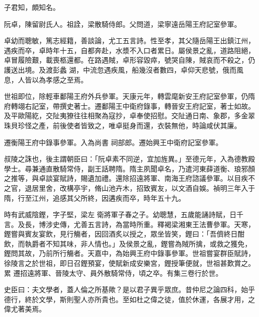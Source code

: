 \begin{pinyinscope}
 子君知，頗知名。



 阮卓，陳留尉氏人。祖詮，梁散騎侍郎。父問道，梁寧遠岳陽王府記室參軍。



 卓幼而聰敏，篤志經籍，善談論，尤工五言詩。性至孝，其父隨岳陽王出鎮江州，遇疾而卒，卓時年十五，自都奔赴，水漿不入口者累日。屬侯景之亂，道路阻絕，卓冒履險艱，載喪柩還都。在路遇賊，卓形容毀瘁，號哭自陳，賊哀而不殺之，仍護送出境。及渡彭蠡
 湖，中流忽遇疾風，船幾沒者數四，卓仰天悲號，俄而風息，人皆以為孝感之至焉。



 世祖即位，除輕車鄱陽王府外兵參軍。天康元年，轉雲麾新安王府記室參軍，仍隋府轉翊右記室，帶撰史著士。遷鄱陽王中衛府錄事，轉晉安王府記室，著士如故。及平歐陽紇，交阯夷獠往往相聚為寇抄，卓奉使招慰。交阯通日南、象郡，多金翠珠貝珍怪之產，前後使者皆致之，唯卓挺身而還，衣裝無他，時論咸伏其廉。



 遷衡陽王府中錄事參軍。入為尚書
 祠部郎。遷始興王中衛府記室參軍。



 叔陵之誅也，後主謂朝臣曰：「阮卓素不同逆，宜加旌異。」至德元年，入為德教殿學士。尋兼通直散騎常侍，副王話聘隋。隋主夙聞卓名，乃遣河東薛道衡、琅邪顏之推等，與卓談宴賦詩，賜遺加禮。還除招遠將軍、南海王府諮議參軍。以目疾不之官，退居里舍，改構亭宇，脩山池卉木，招致賓友，以文酒自娛。禎明三年入于隋，行至江州，追感其父所終，因遘疾而卒，時年五十九。



 時有武威陰鏗，字子堅，梁左
 衛將軍子春之子。幼聰慧，五歲能誦詩賦，日千言。及長，博涉史傳，尤善五言詩，為當時所重。釋褐梁湘東王法曹參軍。天寒，鏗嘗與賓友宴飲，見行觴者，因回酒炙以授之，眾坐皆笑，鏗曰：「吾儕終日酣飲，而執爵者不知其味，非人情也。」及侯景之亂，鏗嘗為賊所擒，或救之獲免，鏗問其故，乃前所行觴者。天嘉中，為始興王府中錄事參軍。世祖嘗宴群臣賦詩，徐陵言之於世祖，即日召鏗預宴，使賦新成安樂宮，鏗授筆便就，世祖甚歎賞之。累
 遷招遠將軍、晉陵太守、員外散騎常侍，頃之卒。有集三卷行於世。



 史臣曰：夫文學者，蓋人倫之所基歟？是以君子異乎眾庶。昔仲尼之論四科，始乎德行，終於文學，斯則聖人亦所貴也。至如杜之偉之徒，值於休運，各展才用，之偉尤著美焉。



\end{pinyinscope}